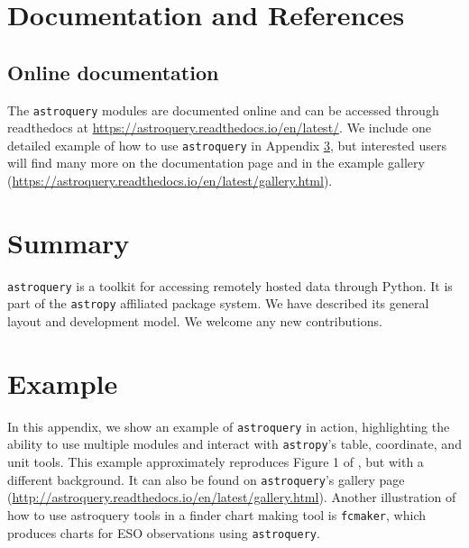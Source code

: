 \documentclass[twocolumn]{aastex62}
\newcommand{\package}[1]{\texttt{#1}\xspace}
\newcommand{\astroquery}{\package{astroquery}}
\newcommand{\astropypkg}{\package{astropy}}
\begin{document}
\section{Documentation and References}
\label{sec:documentation}
\subsection{Online documentation}
The \astroquery modules are documented online and can be accessed through
readthedocs at \url{https://astroquery.readthedocs.io/en/latest/}.
We include one detailed example of how to use \astroquery in Appendix \ref{sec:example},
but interested users will find many more on the documentation page and
in the example gallery (\url{https://astroquery.readthedocs.io/en/latest/gallery.html}).

\section{Summary}
\astroquery is a toolkit for accessing remotely hosted data through Python.
It is part of the \astropypkg affiliated package system.
We have described its general layout and development model.
We welcome any new contributions.





\appendix
\section{Example}
\label{sec:example}
In this appendix, we show an example of \astroquery in action, highlighting the
ability to use multiple modules and interact with \astropypkg's table, coordinate,
and unit tools.  This example approximately reproduces Figure 1 of
\citet{Eisner2016a}, but with a different background.  It can also be found on
\astroquery's gallery page
(\url{http://astroquery.readthedocs.io/en/latest/gallery.html}).
Another illustration of how to use astroquery tools in a finder chart making
tool is \texttt{fcmaker}, which produces charts for ESO observations using
\astroquery \citep{Vogt2018a}.


\newpage

\end{document}

